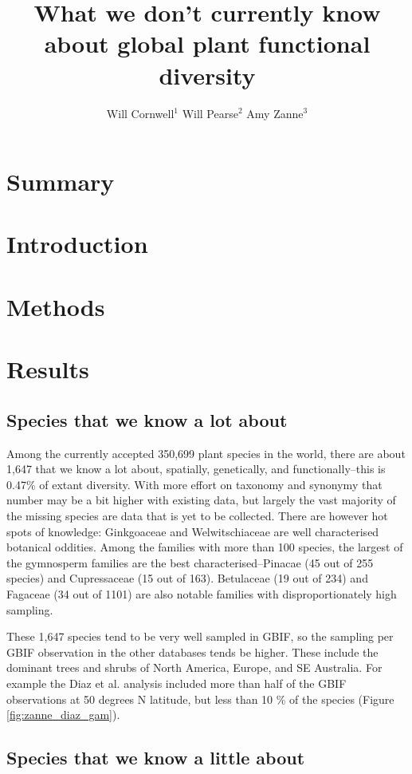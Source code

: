 \documentclass[a4paper,11pt]{article}
\title{What we don't currently know about global plant functional diversity}
\author{
Will Cornwell$^1$
Will Pearse$^2$
Amy Zanne$^3$}
\affiliation{
*final list and order undecided\\
$^1$ University of NSW\\
$^2$ somewhere between Wales and Canada?\\
$^3$ global vagabond}
\date{}
\begin{document}
\mstitlepage
\noindent

\section{Summary}


\section{Introduction}

\section{Methods}

\section{Results}

\subsection{Species  that we know a lot about}

Among the currently accepted 350,699 plant species in the world, there are about 1,647 that we know a lot about, spatially, genetically, and functionally--this is 0.47\% of extant diversity.  With more effort on taxonomy and synonymy that number may be a bit higher with existing data, but largely the vast majority of the missing species are  data that is yet to be collected.  There are however hot spots of knowledge: Ginkgoaceae and Welwitschiaceae are well characterised botanical oddities.  Among the families with more than 100 species, the largest of the gymnosperm families are the best characterised--Pinacae (45 out of 255 species) and Cupressaceae (15 out of 163). Betulaceae (19 out of 234) and Fagaceae (34 out of 1101) are also notable families with disproportionately high sampling.  

These 1,647 species tend to be very well sampled in GBIF, so the sampling per GBIF observation in the other databases tends be higher.  These include the dominant trees and shrubs of North America, Europe, and SE Australia.  For example the Diaz et al. analysis included more than half of the GBIF observations at 50 degrees N latitude, but less than 10 \% of the species (Figure \ref{fig:zanne_diaz_gam}).

\subsection{Species that we know a little about}
\end{document}
